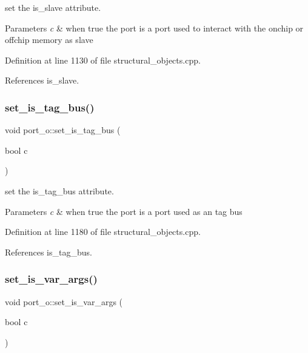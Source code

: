 set the is\+\_\+slave attribute. 


\begin{DoxyParams}{Parameters}
{\em c} & when true the port is a port used to interact with the onchip or offchip memory as slave \\
\hline
\end{DoxyParams}


Definition at line 1130 of file structural\+\_\+objects.\+cpp.



References is\+\_\+slave.

\mbox{\label{structport__o_a6d92dcc21030c37d4a26946fded023e2}} 
\subsubsection{\texorpdfstring{set\+\_\+is\+\_\+tag\+\_\+bus()}{set\_is\_tag\_bus()}}
{\footnotesize\ttfamily void port\+\_\+o\+::set\+\_\+is\+\_\+tag\+\_\+bus (\begin{DoxyParamCaption}\item[{bool}]{c }\end{DoxyParamCaption})}



set the is\+\_\+tag\+\_\+bus attribute. 


\begin{DoxyParams}{Parameters}
{\em c} & when true the port is a port used as an tag bus \\
\hline
\end{DoxyParams}


Definition at line 1180 of file structural\+\_\+objects.\+cpp.



References is\+\_\+tag\+\_\+bus.

\mbox{\label{structport__o_ae411aad0040aacb12b677eeab6ba6271}} 
\subsubsection{\texorpdfstring{set\+\_\+is\+\_\+var\+\_\+args()}{set\_is\_var\_args()}}
{\footnotesize\ttfamily void port\+\_\+o\+::set\+\_\+is\+\_\+var\+\_\+args (\begin{DoxyParamCaption}\item[{bool}]{c }\end{DoxyParamCaption})}



